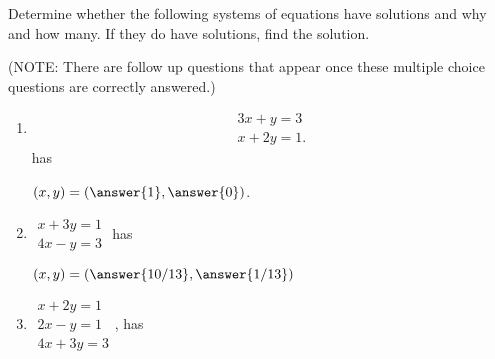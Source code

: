 \documentclass{ximera}
\author{Zack Reed}
\begin{document}
\begin{exercise}

Determine whether the following systems of equations have solutions and why and how many. If they do have solutions, find the solution.

(NOTE: There are follow up questions that appear once these multiple choice questions are correctly answered.)

\begin{enumerate}

\item  \begin{equation*}
    \begin{array}{c}
      3x+y=3 \\
      x+2y=1.
    \end{array}
  \end{equation*} has 

  \begin{multipleChoice}
  \end{multipleChoice}

  \begin{problem}
    $(x,y) = (\answer{1},\answer{0})$.
    \end{problem}

\item $
  \begin{array}{c}
    x+3y=1 \\
    4x-y=3
  \end{array}
  $ has

    \begin{multipleChoice}
    \end{multipleChoice}
  
  \begin{problem}
  
    $(x,y) = (\answer{10/13},\answer{1/13})$

  \end{problem}

\item $
\begin{array}{c}
    x+2y=1 \\
    2x-y=1 \\
    4x+3y=3
  \end{array}
  $, has
  

\end{enumerate}
\end{exercise}
\end{document}
